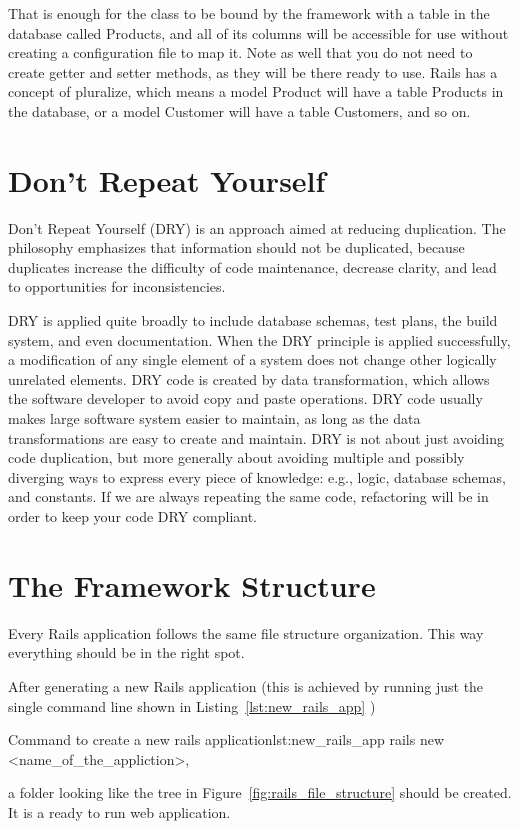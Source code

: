 That is enough for the class to be bound by the framework with a table in the database called Products, and all of its columns will be accessible for use without creating a configuration file to map it. Note as well that you do not need to create getter and setter methods, as they will be there ready to use.
Rails has a concept of pluralize, which means a model Product will have a table Products in the database, or a model Customer will have a table Customers, and so on.



\section{Don’t Repeat Yourself} 
Don’t Repeat Yourself (DRY) is an approach aimed at reducing duplication. 
The philosophy emphasizes that information should not be duplicated, 
because duplicates increase the difficulty of code maintenance, 
decrease clarity, and lead to opportunities for inconsistencies.

DRY is applied quite broadly to include database schemas, 
test plans, the build system, and even documentation. 
When the DRY principle is applied successfully, 
a modification of any single element of a system does not change other logically unrelated elements.
DRY code is created by data transformation, which allows the software developer to avoid copy and paste operations.
DRY code usually makes large software system easier to maintain, 
as long as the data transformations are easy to create and maintain.
DRY is not about just avoiding code duplication, 
but more generally about avoiding multiple and possibly diverging ways to express every piece of knowledge: 
e.g., logic, database schemas, and constants.
If we are always repeating the same code, 
refactoring will be in order to keep your code DRY compliant. 



\section{The Framework Structure} 
Every Rails application follows the same file structure organization. 
This way everything should be in the right spot.

After generating a new Rails application 
(this is achieved by running just the single command line shown in Listing~\ref{lst:new_rails_app} ) 
\begin{rubycode}{Command to create a new rails application}{lst:new_rails_app}
  rails new <name_of_the_appliction>,

\end{rubycode}
a folder looking like the tree in Figure~\ref{fig:rails_file_structure} should be created. 
It is a ready to run web application.

